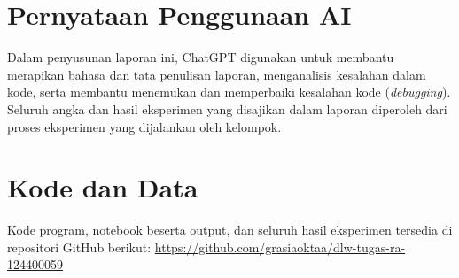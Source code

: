 \documentclass[conference,a4paper]{IEEEtran}
\begin{document}
\section*{Pernyataan Penggunaan AI}
Dalam penyusunan laporan ini, ChatGPT digunakan untuk membantu merapikan bahasa dan tata penulisan laporan, menganalisis kesalahan dalam kode, serta membantu menemukan dan memperbaiki kesalahan kode (\textit{debugging}). Seluruh angka dan hasil eksperimen yang disajikan dalam laporan diperoleh dari proses eksperimen yang dijalankan oleh kelompok.

\section*{Kode dan Data}
Kode program, notebook beserta output, dan seluruh hasil eksperimen tersedia di repositori GitHub berikut:
\url{https://github.com/grasiaoktaa/dlw-tugas-ra-124400059}



\end{document}
